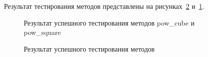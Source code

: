Результат тестирования методов представлены на рисунках~\ref{Screenshot_2:Screenshot_2} и~\ref{Screenshot_1:Screenshot_1}.

\begin{figure}[h!]
\caption{ Результат успешного тестирования методов pow\_cube и pow\_square }
\label{Screenshot_1:Screenshot_1}
\end{figure} 

\begin{figure}[h!]
\caption{ Результат успешного тестирования методов }
\label{Screenshot_2:Screenshot_2}
\end{figure} 

\clearpage







